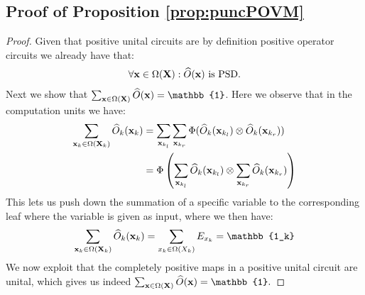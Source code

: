 



\subsection{Proof of Proposition \ref{prop:puncPOVM}}
\label{sec:proof:prop:puncPOVM}

\proppuncPOVM*

\begin{proof}
	Given that positive unital circuits are by definition positive operator circuits we already have that:
	\begin{align}
		\forall \mathbf{x} \in \Omega(\mathbf{X}): \widehat{O}(\mathbf{x}) \text{ is PSD}.
	\end{align}
	Next we show that $\sum_{\xvars\in \Omega(\Xvars)} \punccircuit(\xvars)=\mathbb{1}$. Here we observe that in the computation units we have:
	\begin{align}
		\sum_{\mathbf{x}_k \in \Omega(\mathbf{X}_k)} \widehat{O}_k(\mathbf{x}_k)
		 & = \sum_{\mathbf{x}_{k_l}} \sum_{\mathbf{x}_{k_r}}    \Phi(\widehat{O}_k(\mathbf{x}_{k_l}) \otimes \widehat{O}_k(\mathbf{x}_{k_r})  )
		\\
		 & =
		\Phi \left(
		\sum_{\mathbf{x}_{k_l}}   \widehat{O}_k(\mathbf{x}_{k_l})
		\otimes
		\sum_{\mathbf{x}_{k_r}}\widehat{O}_k(\mathbf{x}_{k_r})
		\nonumber
		\right)
	\end{align}
	This lets us push down the summation of a specific variable to the corresponding leaf where the variable is given as input, where we then have:
	\begin{align}
		\sum_{\xvars_k \in \Omega(\Xvars_k)} \punccircuit_k(\xvars_k)
		= \sum_{\xvar_k\in \Omega(X_k)} E_{\xvar_k}
		= \mathbb{1_k}
	\end{align}
	We now exploit that the completely positive maps in a positive unital circuit are unital, which gives us indeed
	$
		\sum_{\xvars\in \Omega(\Xvars)} \punccircuit(\xvars)=\mathbb{1}.
	$
\end{proof}















